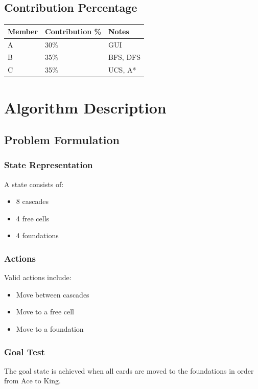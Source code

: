 \documentclass[12pt,a4paper]{article}
\begin{document}
\subsection{Contribution Percentage}
\begin{table}[H]
\centering
\begin{tabular}{lll}
\toprule
\textbf{Member} & \textbf{Contribution \%} & \textbf{Notes} \\
\midrule
A & 30\% & GUI \\
B & 35\% & BFS, DFS \\
C & 35\% & UCS, A* \\
\bottomrule
\end{tabular}
\end{table}

\section{Algorithm Description}

\subsection{Problem Formulation}

\subsubsection{State Representation}
A state consists of:
\begin{itemize}
    \item 8 cascades
    \item 4 free cells
    \item 4 foundations
\end{itemize}

\subsubsection{Actions}
Valid actions include:
\begin{itemize}
    \item Move between cascades
    \item Move to a free cell
    \item Move to a foundation
\end{itemize}

\subsubsection{Goal Test}
The goal state is achieved when all cards are moved to the foundations in order from Ace to King.
\end{document}
